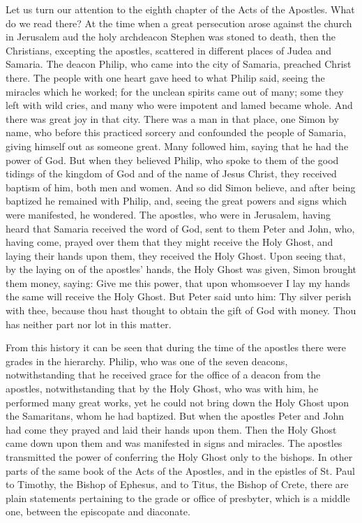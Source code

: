 Let us turn our attention to the eighth chapter
of the Acts of the Apostles. What do we 
read there? At the time when a great persecution
arose against the church in Jerusalem aud 
the holy archdeacon Stephen was stoned to 
death, then the Christians, excepting the 
apostles, scattered in different places of Judea 
and Samaria. The deacon Philip, who came 
into the city of Samaria, preached Christ there. 
The people with one heart gave heed to what 
Philip said, seeing the miracles which he 
worked; for the unclean spirits came out of 
many; some they left with wild cries, and many 
who were impotent and lamed became whole. 
And there was great joy in that city. There 
was a man in that place, one Simon by name, 
who before this practiced sorcery and confounded
the people of Samaria, giving himself 
out as someone great. Many followed him, 
saying that he had the power of God. But 
when they believed Philip, who spoke to them 
of the good tidings of the kingdom of God and 
of the name of Jesus Christ, they received baptism
of him, both men and women. And so did 
Simon believe, and after being baptized he remained
with Philip, and, seeing the great 
powers and signs which were manifested, he 
wondered. The apostles, who were in Jerusalem,
having heard that Samaria received the 
word of God, sent to them Peter and John, who, 
having come, prayed over them that they might 
receive the Holy Ghost, and laying their hands 
upon them, they received the Holy Ghost. 
Upon seeing that, by the laying on of the 
apostles' hands, the Holy Ghost was given,
Simon brought them money, saying: Give me 
this power, that upon whomsoever I lay my 
hands the same will receive the Holy Ghost. 
But Peter said unto him: Thy silver perish 
with thee, because thou hast thought to obtain 
the gift of God with money. Thou has neither 
part nor lot in this matter. 

From this history it can be seen that during the 
time of the apostles there were grades in the 
hierarchy. Philip, who was one of the seven deacons,
notwithstanding that he received grace 
for the office of a deacon from the apostles,
notwithstanding that by the Holy Ghost, who was 
with him, he performed many great works, yet 
he could not bring down the Holy Ghost upon 
the Samaritans, whom he had baptized. But 
when the apostles Peter and John had come 
they prayed and laid their hands upon them. 
Then the Holy Ghost came down upon them 
and was manifested in signs and miracles. The 
apostles transmitted the power of conferring 
the Holy Ghost only to the bishops. In other 
parts of the same book of the Acts of the Apostles,
and in the epistles of St. Paul to Timothy, 
the Bishop of Ephesus, and to Titus, the Bishop 
of Crete, there are plain statements pertaining 
to the grade or office of presbyter, which is a
middle one, between the episcopate and diaconate. 

